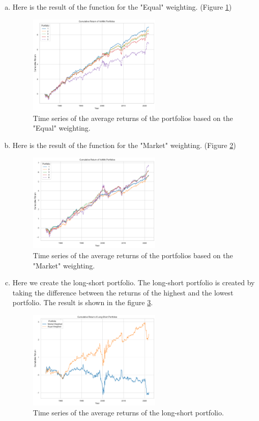\begin{enumerate}[(a)]
\item Here is the result of the function for the "Equal" weighting. (Figure \ref{fig:3a})
\begin{figure}[htbp!]
    \centering
    \includegraphics[width=0.6\textwidth]{Out/3_1.pdf}
    \caption{Time series of the average returns of the portfolios based on the "Equal" weighting.}
    \label{fig:3a}
\end{figure}

\item Here is the result of the function for the "Market" weighting. (Figure \ref{fig:3b})
\begin{figure}
    \centering
    \includegraphics[width=0.6\textwidth]{Out/3_2.pdf}
    \caption{Time series of the average returns of the portfolios based on the "Market" weighting.}
    \label{fig:3b}
\end{figure}

\item Here we create the long-short portfolio. The long-short portfolio is created by taking the difference between the returns of the highest and the lowest portfolio. The result is shown in the figure \ref{fig:3c}.
\begin{figure}
    \centering
    \includegraphics[width=0.6\textwidth]{Out/3_3.pdf}
    \caption{Time series of the average returns of the long-short portfolio.}
    \label{fig:3c}
\end{figure}


\end{enumerate}
